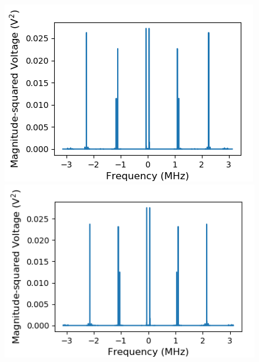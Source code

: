 \documentclass[a4paper]{article}
\begin{document}
\begin{figure}
\centering
\begin{minipage}{.5\textwidth}
	\centering
	\includegraphics[width=.9\linewidth]{7-3/phn}
	\caption{}
	\label{fig:phn}
\end{minipage}%
\begin{minipage}{.5\textwidth}
	\centering
	\includegraphics[width=.9\linewidth]{7-3/pln}
	\caption{}
	\label{fig:pln}
\end{minipage}
\end{figure}
\end{document}
